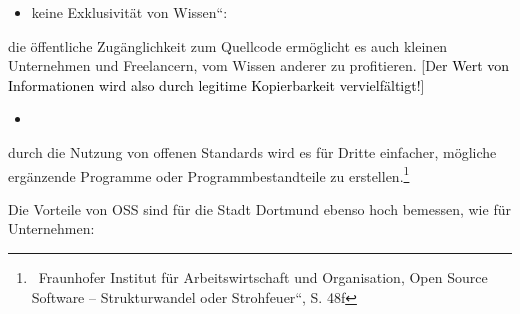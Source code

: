 \documentclass[a4paper]{article}
\newcommand\liststyleWWviiiNumi{%
\renewcommand\theenumi{\arabic{enumi}}
\renewcommand\theenumii{\arabic{enumii}}
\renewcommand\theenumiii{\arabic{enumiii}}
\renewcommand\labelitemi{{}-}
\renewcommand\labelenumi{\theenumi.}
\renewcommand\labelenumii{\theenumii.}
\renewcommand\labelenumiii{\theenumiii.}
}
\begin{document}
\liststyleWWviiiNumi
\begin{itemize}
\item {
{\quotedblbase}keine Exklusivit\"at von Wissen{\textquotedblleft}:}
\end{itemize}
{
die \"offentliche Zug\"anglichkeit zum Quellcode erm\"oglicht es auch
kleinen Unternehmen und Freelancern, vom Wissen anderer zu profitieren.
[D\textcolor{black}{er Wert von Informationen wird also durch legitime
Kopierbarkeit vervielf\"altigt!}]}

\liststyleWWviiiNumi
\begin{itemize}
\item {}
\end{itemize}
{
durch die Nutzung von offenen Standards wird es f\"ur Dritte einfacher,
m\"ogliche erg\"anzende Programme oder Programmbestandteile zu
erstellen.{\guillemotleft}\footnote{\ Fraunhofer Institut f\"ur
Arbeitswirtschaft und Organisation, {\quotedblbase}Open Source Software
-- Strukturwandel oder Strohfeuer{\textquotedblleft}, S. 48f}}


\bigskip

{
Die Vorteile von OSS sind f\"ur die Stadt Dortmund ebenso hoch bemessen,
wie f\"ur Unternehmen:}


\bigskip
\end{document}
